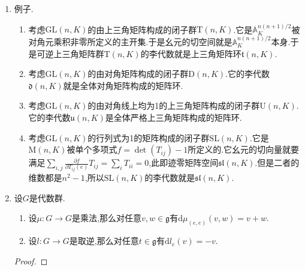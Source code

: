 \begin{enumerate}
\begin{proof}
    	一方面设$v\in\mathfrak{h}$,取$f\in I$和$h\in H$,那么有$(D_vf)(h)=v(L_{h^{-1}}f)=0$,因为$L_{h^{-1}}f\in I$.于是$D_vf\in I$.反过来任取$v\in\mathfrak{g}$使得$D_vI\subseteq I$.那么对任意$f\in I$就有$(D_vf)(e)=v(f)=0$.于是$v(I)=0$,于是$v\in\mathfrak{h}$.
    \end{proof}
    \item 例子.
    \begin{enumerate}[(1)]
    	\item 考虑$\mathrm{GL}(n,K)$的由上三角矩阵构成的闭子群$\mathrm{T}(n,K)$.它是$\mathbb{A}^{n(n+1)/2}_K$被对角元乘积非零所定义的主开集.于是幺元的切空间就是$\mathbb{A}^{n(n+1)/2}_K$本身.于是可逆上三角矩阵群$\mathrm{T}(n,K)$的李代数就是上三角矩阵环$\mathfrak{t}(n,K)$.
    	\item 考虑$\mathrm{GL}(n,K)$的由对角矩阵构成的闭子群$\mathrm{D}(n,K)$.它的李代数$\mathfrak{d}(n,K)$就是全体对角矩阵构成的矩阵环.
    	\item 考虑$\mathrm{GL}(n,K)$的由对角线上均为1的上三角矩阵构成的闭子群$\mathrm{U}(n,K)$.它的李代数$\mathfrak{u}(n,K)$是全体严格上三角矩阵构成的矩阵环.
    	\item 考虑$\mathrm{GL}(n,K)$的行列式为1的矩阵构成的闭子群$\mathrm{SL}(n,K)$.它是$\mathrm{M}(n,K)$被单个多项式$f=\det(T_{ij})-1$所定义的.它幺元的切向量就要满足$\sum_{i,j}\frac{\partial f}{\partial T_{ij}(e)}T_{ij}=\sum_iT_{ii}=0$,此即迹零矩阵空间$\mathfrak{sl}(n,K)$.但是二者的维数都是$n^2-1$,所以$\mathrm{SL}(n,K)$的李代数就是$\mathfrak{sl}(n,K)$.
    \end{enumerate}
    \item 设$G$是代数群.
    \begin{enumerate}[(1)]
    	\item 设$\mu:G\to G$是乘法,那么对任意$v,w\in\mathfrak{g}$有$\mathrm{d}\mu_{(e,e)}(v,w)=v+w$.
    	\item 设$l:G\to G$是取逆,那么对任意$t\in\mathfrak{g}$有$\mathrm{d}l_e(v)=-v$.
    \end{enumerate}
    \begin{proof}
    	

\end{proof}
\end{enumerate}
